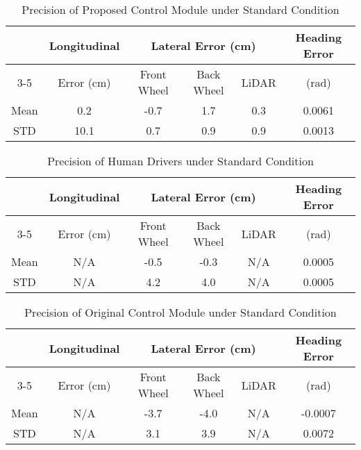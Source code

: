 \documentclass[letterpaper, 10 pt, conference]{ieeeconf}
\begin{document}
\begin{table*}[]
\caption{Precision of Proposed Control Module under Standard Condition}
\label{table:normal_condition}
\centering
\small
\begin{tabular}{|c|c|c|c|c|c|}
\hline
\multirow{2}{*}{} & Longitudinal & \multicolumn{3}{c|}{Lateral Error (cm)} & \multirow{2}{*}{Heading Error} \\ \cline{3-5}
 & Error (cm) & Front Wheel & Back Wheel & LiDAR & (rad) \\ \hline
Mean & 0.2 & -0.7 & 1.7 & 0.3 & 0.0061 \\ \hline
STD & 10.1 & 0.7 & 0.9 & 0.9 & 0.0013 \\ \hline
\end{tabular}
\end{table*}

\begin{table*}[]
\caption{Precision of Human Drivers under Standard Condition}
\label{table:human_driver}
\centering
\small
\begin{tabular}{|c|c|c|c|c|c|}
\hline
\multirow{2}{*}{} & Longitudinal & \multicolumn{3}{c|}{Lateral Error (cm)} & \multirow{2}{*}{Heading Error} \\ \cline{3-5}
 & Error (cm) & Front Wheel & Back Wheel & LiDAR & (rad) \\ \hline
Mean & N/A & -0.5 & -0.3 & N/A & 0.0005 \\ \hline
STD & N/A & 4.2 & 4.0 & N/A & 0.0005 \\ \hline
\end{tabular}
\end{table*}

\begin{table*}[]
\caption{Precision of Original Control Module under Standard Condition}
\label{table:original_control}
\centering
\small
\begin{tabular}{|c|c|c|c|c|c|}
\hline
\multirow{2}{*}{} & Longitudinal & \multicolumn{3}{c|}{Lateral Error (cm)} & \multirow{2}{*}{Heading Error} \\ \cline{3-5}
 & Error (cm) & Front Wheel & Back Wheel & LiDAR & (rad) \\ \hline
Mean & N/A & -3.7 & -4.0 & N/A & -0.0007 \\ \hline
STD & N/A & 3.1 & 3.9 & N/A & 0.0072 \\ \hline
\end{tabular}
\end{table*}
\end{document}
